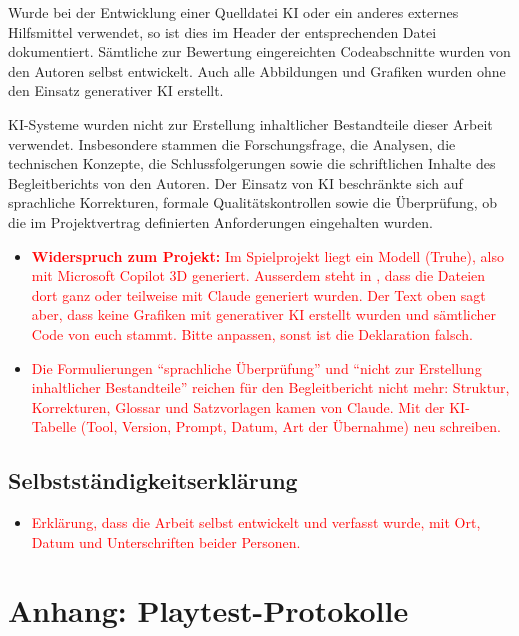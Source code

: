 \documentclass[../Main.tex]{subfiles}
\begin{document}
Wurde bei der Entwicklung einer Quelldatei KI oder ein anderes externes Hilfsmittel verwendet, so ist dies im Header der entsprechenden Datei dokumentiert. Sämtliche zur Bewertung eingereichten Codeabschnitte wurden von den Autoren selbst entwickelt. Auch alle Abbildungen und Grafiken wurden ohne den Einsatz generativer KI erstellt.

KI-Systeme wurden nicht zur Erstellung inhaltlicher Bestandteile dieser Arbeit verwendet. Insbesondere stammen die Forschungsfrage, die Analysen, die technischen Konzepte, die Schlussfolgerungen sowie die schriftlichen Inhalte des Begleitberichts von den Autoren. Der Einsatz von KI beschränkte sich auf sprachliche Korrekturen, formale Qualitätskontrollen sowie die Überprüfung, ob die im Projektvertrag definierten Anforderungen eingehalten wurden.

\begin{itemize}[leftmargin=1.5cm]
    \item \textcolor{red}{\textbf{Widerspruch zum Projekt:} Im Spielprojekt liegt ein Modell  (Truhe), also mit Microsoft Copilot 3D generiert. Ausserdem steht in , dass die Dateien dort ganz oder teilweise mit Claude generiert wurden. Der Text oben sagt aber, dass keine Grafiken mit generativer KI erstellt wurden und sämtlicher Code von euch stammt. Bitte anpassen, sonst ist die Deklaration falsch.}
    \item \textcolor{red}{Die Formulierungen \enquote{sprachliche Überprüfung} und \enquote{nicht zur Erstellung inhaltlicher Bestandteile} reichen für den Begleitbericht nicht mehr: Struktur, Korrekturen, Glossar und Satzvorlagen kamen von Claude. Mit der KI-Tabelle (Tool, Version, Prompt, Datum, Art der Übernahme) neu schreiben.}
\end{itemize}

\subsection{Selbstständigkeitserklärung}

\begin{itemize}[leftmargin=1.5cm]
    \item \textcolor{red}{Erklärung, dass die Arbeit selbst entwickelt und verfasst wurde, mit Ort, Datum und Unterschriften beider Personen.}
\end{itemize}

\newpage
{}
\section{Anhang: Playtest-Protokolle} \label{sec:PlaytestProtokolle}
\end{document}
